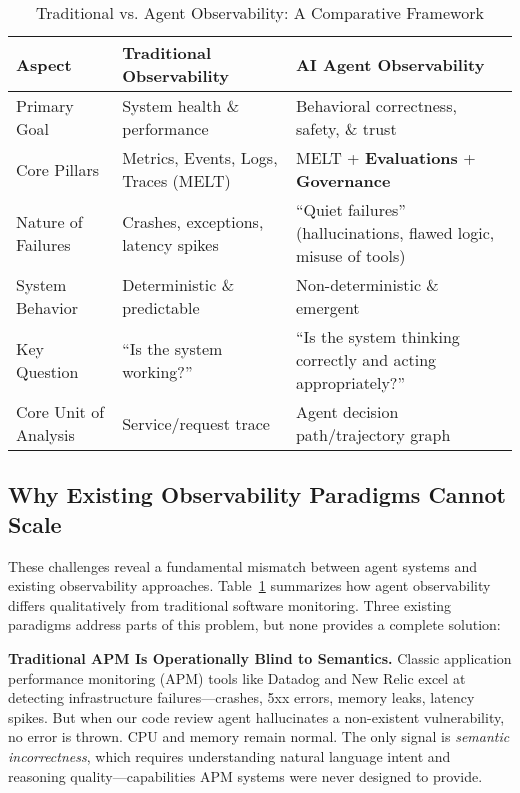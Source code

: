 \documentclass[sigplan,screen,9pt]{acmart}
\begin{document}
\begin{table}[t]
  \caption{Traditional vs. Agent Observability: A Comparative Framework}
  \label{tab:diff}
  \begin{tabular}{@{}p{3.2cm}p{4.2cm}p{4.2cm}@{}}
    \toprule
    \textbf{Aspect} &
    \textbf{Traditional Observability} &
    \textbf{AI Agent Observability} \\
    \midrule
    Primary Goal &
    System health \& performance &
    Behavioral correctness, safety, \& trust \\
    Core Pillars &
    Metrics, Events, Logs, Traces (MELT) &
    MELT + \textbf{Evaluations} + \textbf{Governance} \\
    Nature of Failures &
    Crashes, exceptions, latency spikes &
    ``Quiet failures'' (hallucinations, flawed logic, misuse of tools) \\
    System Behavior &
    Deterministic \& predictable &
    Non-deterministic \& emergent \\
    Key Question &
    ``Is the system working?'' &
    ``Is the system thinking correctly and acting appropriately?'' \\
    Core Unit of Analysis &
    Service/request trace &
    Agent decision path/trajectory graph \\
    \bottomrule
  \end{tabular}
\end{table}

\subsection{Why Existing Observability Paradigms Cannot Scale}

These challenges reveal a fundamental mismatch between agent systems and existing observability approaches. Table~\ref{tab:diff} summarizes how agent observability differs qualitatively from traditional software monitoring. Three existing paradigms address parts of this problem, but none provides a complete solution:

\textbf{Traditional APM Is Operationally Blind to Semantics.} Classic application performance monitoring (APM) tools like Datadog and New Relic excel at detecting infrastructure failures—crashes, 5xx errors, memory leaks, latency spikes. But when our code review agent hallucinates a non-existent vulnerability, no error is thrown. CPU and memory remain normal. The only signal is \emph{semantic incorrectness}, which requires understanding natural language intent and reasoning quality—capabilities APM systems were never designed to provide.
\end{document}
